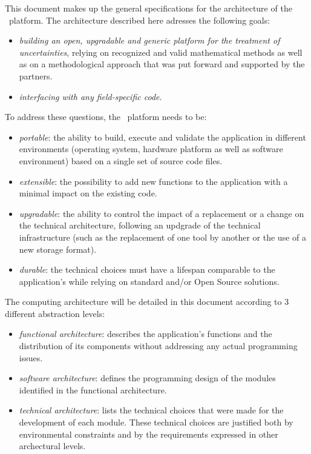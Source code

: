 
This document makes up the general specifications for the architecture of the \OT\ platform. The architecture described here adresses the following goals:
\begin{itemize}
\item \emph{building an open, upgradable and generic platform for the treatment of uncertainties}, relying on recognized and valid mathematical methods as well as on a methodological approach that was put forward and supported by the partners.
\item \emph{interfacing with any field-specific code}.
\end{itemize}

To address these questions, the \OT\ platform needs to be:
\begin{itemize}
\item \emph{portable}: the ability to build, execute and validate the application in different environments (operating system, hardware platform as well as software environment) based on a single set of source code files.
\item \emph{extensible}: the possibility to add new functions to the application with a minimal impact on the existing code.
\item \emph{upgradable}: the ability to control the impact of a replacement or a change on the technical architecture, following an updgrade of the technical infrastructure (such as the replacement of one tool by another or the use of a new storage format).
\item \emph{durable}: the technical choices must have a lifespan comparable to the application's while relying on standard and/or Open Source solutions.
\end{itemize}


The computing architecture will be detailed in this document according to 3 different abstraction levels:
\begin{itemize}
\item \emph{functional architecture}: describes the application's functions and the distribution of its components without addressing any actual programming issues.
\item \emph{software architecture}: defines the programming design of the modules identified in the functional architecture.
\item \emph{technical architecture}: lists the technical choices that were made for the development of each module. These technical choices are justified both by environmental constraints and by the requirements expressed in other archectural levels.
\end{itemize}

